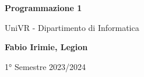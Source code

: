 \begin{titlepage}
	\begin{center}
		\vspace*{1cm}

		\Huge
		\textbf{Programmazione 1}

		\vspace{0.5cm}
		\LARGE
		UniVR - Dipartimento di Informatica

		\vspace{1.5cm}

		\textbf{Fabio Irimie, Legion}

		\vfill


		\vspace{0.8cm}


		1° Semestre 2023/2024

	\end{center}
\end{titlepage}
